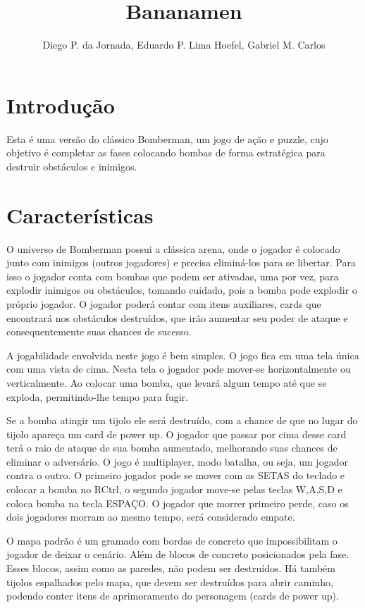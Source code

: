 \documentclass[12pt]{article}
\title{Bananamen}
\author{Diego P. da Jornada, Eduardo P. Lima Hoefel, Gabriel M. Carlos}
\begin{document}
 

\maketitle

\section{Introdução}

	Esta é uma versão do clássico Bomberman, um jogo de ação
	e puzzle, cujo objetivo é completar as fases colocando
	bombas de forma estratégica para destruir obstáculos e
	inimigos.

\section{Características}

	O universo de Bomberman possui a clássica arena, onde o
	jogador é colocado junto com inimigos (outros jogadores)
	e precisa eliminá-los para se libertar. Para isso o
	jogador conta com bombas que podem ser ativadas, uma por
	vez, para explodir inimigos ou obstáculos, tomando
	cuidado, pois a bomba pode explodir o próprio jogador. O
	jogador poderá contar com itens auxiliares, cards que
	encontrará nos obstáculos destruídos, que irão aumentar
	seu poder de ataque e consequentemente suas chances de
	sucesso.

	A jogabilidade envolvida neste jogo é bem simples. O
	jogo fica em uma tela única com uma vista de cima. Nesta
	tela o jogador pode mover-se horizontalmente ou
	verticalmente. Ao colocar uma bomba, que levará algum
	tempo até que se exploda, permitindo-lhe tempo para
	fugir.

	Se a bomba atingir um tijolo ele será destruído, com a
	chance de que no lugar do tijolo apareça um card de
	power up. O jogador que passar por cima desse card terá
	o raio de ataque de sua bomba aumentado, melhorando suas
	chances de eliminar o adversário.  O jogo é multiplayer,
	modo batalha, ou seja, um jogador contra o outro. O
	primeiro jogador pode se mover com as SETAS do teclado e
	colocar a bomba no RCtrl, o segundo jogador move-se
	pelas teclas W,A,S,D e coloca bomba na tecla ESPAÇO. O
	jogador que morrer primeiro perde, caso os dois
	jogadores morram ao mesmo tempo, será considerado
	empate.

	O mapa padrão é um gramado com bordas de concreto que
	impossibilitam o jogador de deixar o cenário. Além de
	blocos de concreto posicionados pela fase. Esses blocos,
	assim como as paredes, não podem ser destruídos. Há
	também tijolos espalhados pelo mapa, que devem ser
	destruídos para abrir caminho, podendo conter itens de
	aprimoramento do personagem (cards de power up).
\end{document}
